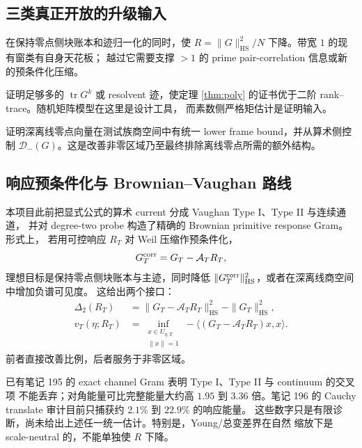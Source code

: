 \documentclass[UTF8,11pt,a4paper]{ctexart}
\theoremstyle{definition}
\theoremstyle{remark}
\newcommand{\tr}{\operatorname{tr}}
\newcommand{\HS}{\mathrm{HS}}
\begin{document}
\subsection{三类真正开放的升级输入}

\begin{description}[leftmargin=3.7cm,style=nextline]
\item[更小的二阶矩常数]
在保持零点侧块账本和迹归一化的同时，使
$R=\|G\|_{\HS}^2/N$ 下降。带宽 $1$ 的现有窗类有自身天花板；
越过它需要支撑 $>1$ 的 prime pair-correlation 信息或新的预条件化压缩。

\item[高阶混合矩]
证明足够多的 $\tr G^k$ 或 resolvent 迹，使定理
\ref{thm:poly} 的证书优于二阶 rank--trace。随机矩阵模型在这里是设计工具，
而素数侧严格矩估计是证明输入。

\item[深度可见性与负谱预算]
证明深离线零点向量在测试族商空间中有统一 lower frame bound，并从算术侧控制
$\mathcal{D}_-(G)$。这是改善非零区域乃至最终排除离线零点所需的额外结构。
\end{description}

\subsection{响应预条件化与 Brownian--Vaughan 路线}

本项目此前把显式公式的算术 current 分成 Vaughan Type I、Type II 与连续通道，
并对 degree-two probe 构造了精确的 Brownian primitive response Gram。形式上，
若用可控响应 $R_T$ 对 Weil 压缩作预条件化，
\[
 G_T^{\rm corr}=G_T-\mathcal A_T R_T,
\]
理想目标是保持零点侧块账本与主迹，同时降低
$\|G_T^{\rm corr}\|_{\HS}^2$，或者在深离线商空间中增加负谱可见度。
这给出两个接口：
\begin{align}
 \Delta_2(R_T)
 &=\|G_T-\mathcal A_TR_T\|_{\HS}^2-\|G_T\|_{\HS}^2,\\
 v_T(\eta;R_T)
 &=\inf_{\substack{x\in U_{\eta,T}\\\|x\|=1}}
  -\langle(G_T-\mathcal A_TR_T)x,x\rangle.
\end{align}
前者直接改善比例，后者服务于非零区域。

已有笔记 195 的 exact channel Gram 表明 Type I、Type II 与 continuum 的交叉项
不能丢弃；对角能量可比完整能量大约高 $1.95$ 到 $3.36$ 倍。笔记 196 的
Cauchy translate 审计目前只捕获约 $2.1\%$ 到 $22.9\%$ 的响应能量。
这些数字只是有限诊断，尚未给出上述任一统一估计。特别是，Young/总变差界在自然
缩放下是 scale-neutral 的，不能单独使 $R$ 下降。
\end{document}
